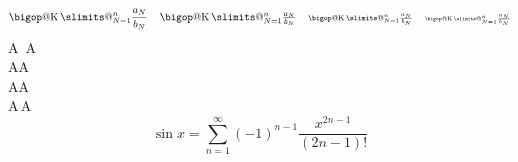 \documentclass{article}
\makeatletter
\DeclareRobustCommand\bigop[1]{%
	\mathop{\vphantom{\sum}\mathpalette\bigop@{#1}}\slimits@
}
\newcommand{\bigop@}[2]{%
	\vcenter{%
		\sbox\z@{$#1\sum$}%
		\hbox{\resizebox{\ifx#1\displaystyle.9\fi\dimexpr\ht\z@+\dp\z@}{!}{$\m@th#2$}}%
	}%
}
\newcommand{\bigK}{\DOTSB\bigop{\mathrm{K}}}
\makeatother
\begin{document}
	\[
	\bigK_{N=1}^n \frac{a_N}{b_N}
	\quad
	\textstyle
	\bigK_{N=1}^n \frac{a_N}{b_N}
	\quad
	\scriptstyle
	\bigK_{N=1}^n \frac{a_N}{b_N}
	\quad
	\scriptscriptstyle
	\bigK_{N=1}^n \frac{a_N}{b_N}
	\]
	A\ A
	\\
	A\;A
	\\
	A\:A
	\\
	A\,A
	$$
	\sin x =\sum_{n=1}^{\infty}(-1)^{n-1}\dfrac{x^{2n-1}}{(2n-1)!}
	$$
\end{document}
